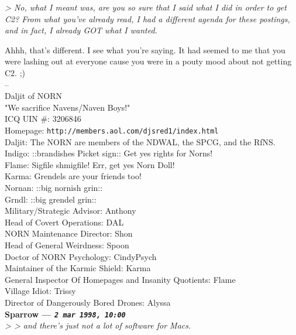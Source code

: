 \documentclass[11pt,twoside,a4paper]{article}
\begin{document}
\begin{multicols*}{2}
\emph{> No, what I meant was, are you so sure that I said what I did in order to get C2? From what you've already read, I had a different agenda for these postings, and in fact, I already GOT what I wanted.}

Ahhh, that's different.  I see what you're saying. It had seemed to me that you were lashing out at everyone cause you were in a pouty mood about not getting C2.  ;)~\\

-- ~\\
Daljit of NORN~\\
"We sacrifice Navens/Naven Boys!"~\\
ICQ UIN \#:  3206846~\\
Homepage:  \texttt{http://members.aol.com/djsred1/index.html}~\\

Daljit:  The NORN are members of the NDWAL, the SPCG, and the RfNS.~\\
Indigo:  ::brandishes Picket sign::  Get yes rights for Norns!~\\
Flame:  Sigfile shmigfile!  Err, get yes Norn Doll!~\\
Karma:  Grendels are your friends too!~\\
Nornan:  ::big nornish grin::~\\
Grndl:  ::big grendel grin::~\\

Military/Strategic Advisor:  Anthony~\\
Head of Covert Operations:  DAL~\\
NORN Maintenance Director:  Shon~\\
Head of General Weirdness:  Spoon~\\
Doctor of NORN Psychology:  CindyPsych~\\
Maintainer of the Karmic Shield:  Karma~\\
General Inspector Of Homepages and Insanity Quotients:  Flame~\\
Village Idiot:  Trissy~\\
Director of Dangerously Bored Drones:  Alyssa~\\

 
		
	
		
\textbf{Sparrow --- \emph{\texttt{2 mar 1998, 10:00}}}~\\

\emph{> > and there's just not a lot of software for Macs.}~\\


\end{multicols*}
\end{document}
